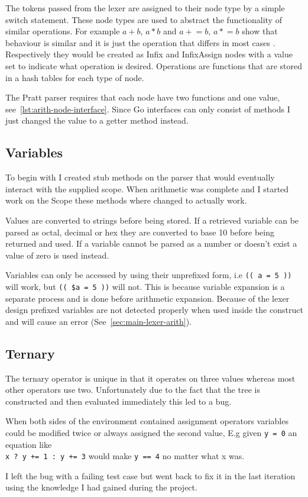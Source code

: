 The tokens passed from the lexer are assigned to their node type by a simple switch statement.
These node types are used to abstract the functionality of similar operations.
For example $a + b$, $a * b$ and $a \mathrel{+}= b$, $a \mathrel{*}= b$ show that behaviour is similar and it is just the operation that differs in most cases .
Respectively they would be created as Infix and InfixAssign nodes with a value set to indicate what operation is desired.
Operations are functions that are stored in a hash tables for each type of node.

The Pratt parser requires that each node have two functions and one value, see~\ref{lst:arith-node-interface}.
Since Go interfaces can only consist of methods I just changed the value to a getter method instead.

\subsection{Variables}
To begin with I created stub methods on the parser that would eventually interact with the supplied scope.
When arithmetic was complete and I started work on the Scope these methods where changed to actually work.

Values are converted to strings before being stored.
If a retrieved variable can be parsed as octal, decimal or hex they are converted to base 10 before being returned and used.
If a variable cannot be parsed as a number or doesn't exist a value of zero is used instead.

Variables can only be accessed by using their unprefixed form, i.e \verb!(( a = 5 ))! will work, but \verb!(( $a = 5 ))! will not.
This is because variable expansion is a separate process and is done before arithmetic expansion.
Because of the lexer design prefixed variables are not detected properly when used inside the construct and will cause an error (See~\ref{sec:main-lexer-arith}).

\subsection{Ternary}
The ternary operator is unique in that it operates on three values whereas most other operators use two.
Unfortunately due to the fact that the tree is constructed and then evaluated immediately this led to a bug.

When both sides of the environment contained assignment operators variables could be modified twice or always assigned the second value, E.g given \verb!y = 0! an equation like \\ \verb!x ? y += 1 : y += 3! would make \verb!y == 4! no matter what x was.

I left the bug with a failing test case but went back to fix it in the last iteration using the knowledge I had gained during the project.